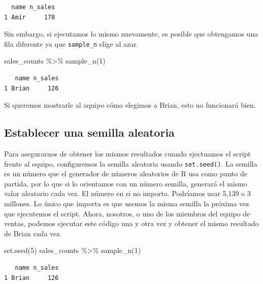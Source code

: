 \documentclass[
  letterpaper,
  DIV=11,
  numbers=noendperiod]{scrreprt}
\newenvironment{Shaded}{\begin{snugshade}}{\end{snugshade}}
\newcommand{\DecValTok}[1]{\textcolor[rgb]{0.68,0.00,0.00}{#1}}
\newcommand{\FunctionTok}[1]{\textcolor[rgb]{0.28,0.35,0.67}{#1}}
\newcommand{\NormalTok}[1]{\textcolor[rgb]{0.00,0.23,0.31}{#1}}
\newcommand{\SpecialCharTok}[1]{\textcolor[rgb]{0.37,0.37,0.37}{#1}}
\begin{document}
\begin{verbatim}
  name n_sales
1 Amir     178
\end{verbatim}

Sin embargo, si ejecutamos lo mismo nuevamente, es posible que
obtengamos una fila diferente ya que \texttt{sample\_n} elige al azar.

\begin{Shaded}
\begin{Highlighting}[]
\NormalTok{sales\_counts }\SpecialCharTok{\%\textgreater{}\%} 
  \FunctionTok{sample\_n}\NormalTok{(}\DecValTok{1}\NormalTok{)}
\end{Highlighting}
\end{Shaded}

\begin{verbatim}
   name n_sales
1 Brian     126
\end{verbatim}

Si queremos mostrarle al aquipo cómo elegimos a Brian, esto no
funcionará bien.

\hypertarget{establecer-una-semilla-aleatoria}{%
\subsection{Establecer una semilla
aleatoria}\label{establecer-una-semilla-aleatoria}}

Para asegurarnos de obtener los mismos resultados cuando ejectuamos el
script frente al equipo, configuremos la semilla aleatoria usando
\texttt{set.seed()}. La semilla es un número que el generador de números
aleatorios de R usa como punto de partida, por lo que si lo orientamos
con un número semilla, generará el mismo valor aleatorio cada vez. El
número en si no importa. Podríamos usar 5,139 o 3 millones. Lo único que
importa es que usemos la misma semilla la próxima vez que ejecutemos el
script. Ahora, nosotros, o uno de los miembros del equipo de ventas,
podemos ejecutar este código una y otra vez y obtener el mismo resultado
de Brian cada vez.

\begin{Shaded}
\begin{Highlighting}[]
\FunctionTok{set.seed}\NormalTok{(}\DecValTok{5}\NormalTok{)}
\NormalTok{sales\_counts }\SpecialCharTok{\%\textgreater{}\%} 
  \FunctionTok{sample\_n}\NormalTok{(}\DecValTok{1}\NormalTok{)}
\end{Highlighting}
\end{Shaded}

\begin{verbatim}
   name n_sales
1 Brian     126
\end{verbatim}
\end{document}
